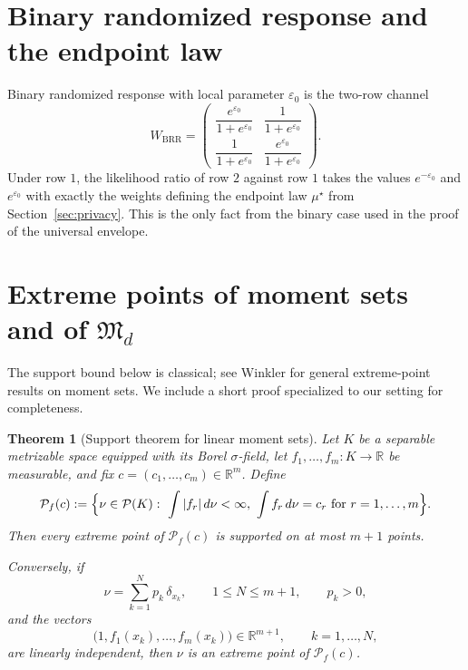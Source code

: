 \documentclass[11pt]{amsart}
\newtheorem{theorem}{Theorem}[section]
\theoremstyle{definition}
\newcommand{\R}{\mathbb R}
\newcommand{\cP}{\mathcal P}
\newcommand{\fM}{\mathfrak M}
\begin{document}
\section{Binary randomized response and the endpoint law}\label{app:brr}

Binary randomized response with local parameter $\varepsilon_0$ is the two-row channel
\[
W_{\mathrm{BRR}}=
\begin{pmatrix}
\dfrac{e^{\varepsilon_0}}{1+e^{\varepsilon_0}} & \dfrac{1}{1+e^{\varepsilon_0}}\\[1.2ex]
\dfrac{1}{1+e^{\varepsilon_0}} & \dfrac{e^{\varepsilon_0}}{1+e^{\varepsilon_0}}
\end{pmatrix}.
\]
Under row $1$, the likelihood ratio of row $2$ against row $1$ takes the values $e^{-\varepsilon_0}$ and $e^{\varepsilon_0}$ with exactly the weights defining the endpoint law $\mu^\star$ from Section~\ref{sec:privacy}. This is the only fact from the binary case used in the proof of the universal envelope.

\section{Extreme points of moment sets and of \texorpdfstring{$\fM_d$}{Md}}\label{app:extreme}

The support bound below is classical; see Winkler \cite{winkler-moment} for general extreme-point results on moment sets. We include a short proof specialized to our setting for completeness.

\begin{theorem}[Support theorem for linear moment sets]\label{thm:moment-support}
Let $K$ be a separable metrizable space equipped with its Borel $\sigma$-field, let $f_1,\dots,f_m:K\to \R$ be measurable, and fix $c=(c_1,\dots,c_m)\in \R^m$. Define
\[
\cP_f(c):=\Bigl\{\nu\in \cP(K):\ \int |f_r|\,d\nu<\infty,\ \int f_r\,d\nu=c_r\ \text{for }r=1,\dots,m\Bigr\}.
\]
Then every extreme point of $\cP_f(c)$ is supported on at most $m+1$ points.

Conversely, if
\[
\nu=\sum_{k=1}^N p_k\,\delta_{x_k},
\qquad
1\le N\le m+1,
\qquad
p_k>0,
\]
and the vectors
\[
\bigl(1,f_1(x_k),\dots,f_m(x_k)\bigr)\in \R^{m+1},
\qquad k=1,\dots,N,
\]
are linearly independent, then $\nu$ is an extreme point of $\cP_f(c)$.
\end{theorem}
\end{document}

